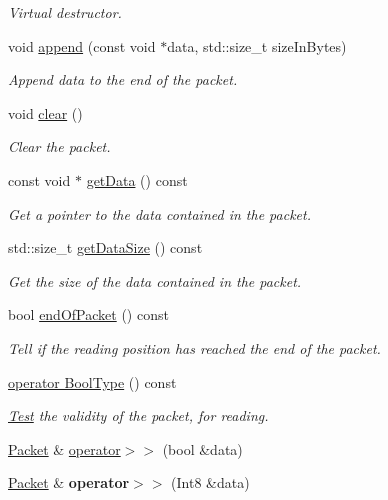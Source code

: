 \begin{DoxyCompactItemize}
\begin{DoxyCompactList}\small\item\em Virtual destructor. \end{DoxyCompactList}\item 
void \hyperlink{classsf_1_1Packet_a7dd6e429b87520008326c4d71f1cf011}{append} (const void $\ast$data, std\-::size\-\_\-t size\-In\-Bytes)
\begin{DoxyCompactList}\small\item\em Append data to the end of the packet. \end{DoxyCompactList}\item 
void \hyperlink{classsf_1_1Packet_a133ea8b8fe6e93c230f0d79f19a3bf0d}{clear} ()
\begin{DoxyCompactList}\small\item\em Clear the packet. \end{DoxyCompactList}\item 
const void $\ast$ \hyperlink{classsf_1_1Packet_a304ba9ec94c992710f4dfff879c6340e}{get\-Data} () const 
\begin{DoxyCompactList}\small\item\em Get a pointer to the data contained in the packet. \end{DoxyCompactList}\item 
std\-::size\-\_\-t \hyperlink{classsf_1_1Packet_a004b62aa5bafa69df8917171a3fe1fa0}{get\-Data\-Size} () const 
\begin{DoxyCompactList}\small\item\em Get the size of the data contained in the packet. \end{DoxyCompactList}\item 
bool \hyperlink{classsf_1_1Packet_aee3adfca6303f1e6bde3c62be392b945}{end\-Of\-Packet} () const 
\begin{DoxyCompactList}\small\item\em Tell if the reading position has reached the end of the packet. \end{DoxyCompactList}\item 
\hyperlink{classsf_1_1Packet_addcb990cde37859c748273d9de55e628}{operator Bool\-Type} () const 
\begin{DoxyCompactList}\small\item\em \hyperlink{classTest}{Test} the validity of the packet, for reading. \end{DoxyCompactList}\item 
\hyperlink{classsf_1_1Packet}{Packet} \& \hyperlink{classsf_1_1Packet_af8e26c63ba9bdccd262565ff0d3eeba2}{operator$>$$>$} (bool \&data)
\item 
\hypertarget{classsf_1_1Packet_a70fd5abb9095b5335b79c0cefd17b222}{\hyperlink{classsf_1_1Packet}{Packet} \& {\bfseries operator$>$$>$} (Int8 \&data)}\label{classsf_1_1Packet_a70fd5abb9095b5335b79c0cefd17b222}


\end{DoxyCompactItemize}
